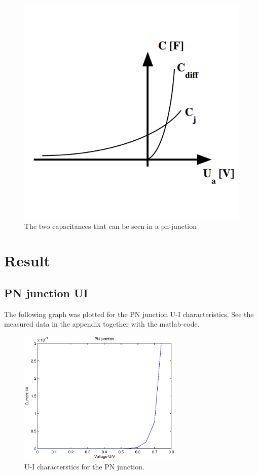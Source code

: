 \documentclass[a4paper]{article}
\begin{document}
\begin{figure}[H]
\centering
\includegraphics[scale=0.3]{capp.png}
\caption{The two capacitances that can be seen in a pn-junction}
\label{capp}
\end{figure}

\section{Result}
\subsection{PN junction UI}
The following graph was plotted for the PN junction U-I characteristics. See the measured data in the appendix together with the matlab-code. 
\begin{figure}[H]
	\centering
	\includegraphics[width=0.7\textwidth]{pn_ui.eps}
	\caption{U-I characterstics for the PN junction.}	
	\label{pn_ui}
\end{figure}
\end{document}
